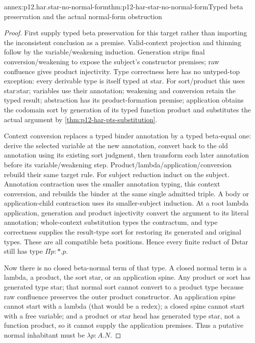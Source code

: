 \begin{annexitem}{annex:p12.har.star-no-normal-form}{thm:p12-har-star-no-normal-form}{Typed beta preservation and the actual normal-form obstruction}
\begin{proof}
First supply typed beta preservation for this target rather than importing
the inconsistent conclusion as a premise. Valid-context projection and
thinning follow by the variable/weakening induction. Generation strips
final conversion/weakening to expose the subject's constructor premises;
raw confluence gives product injectivity. Type correctness here has no
untyped-top exception: every derivable type is itself typed at star.
For sort/product this uses star:star; variables use their annotation;
weakening and conversion retain the typed result; abstraction has its
product-formation premise; application obtains the codomain sort by
generation of its typed function product and substitutes the actual
argument by \cref{thm:p12-har-pts-substitution}.

Context conversion replaces a typed binder annotation by a typed
beta-equal one: derive the selected variable at the new annotation,
convert back to the old annotation using its existing sort judgment,
then transform each later annotation before its variable/weakening step.
Product/lambda/application/conversion rebuild their same target rule.
For subject reduction induct on the subject. Annotation contraction
uses the smaller annotation typing, this context conversion, and
rebuilds the binder at the same single admitted triple. A body or
application-child contraction uses its smaller-subject induction.
At a root lambda application, generation and product injectivity
convert the argument to its literal annotation; whole-context
substitution types the contractum, and type correctness supplies the
result-type sort for restoring its generated and original types.
These are all compatible beta positions. Hence every finite reduct
of Dstar still has type \(\Pi p:\ast.p\).

Now there is no closed beta-normal term of that type. A closed normal
term is a lambda, a product, the sort star, or an application spine.
Any product or sort has generated type star; that normal sort cannot
convert to a product type because raw confluence preserves the outer
product constructor. An application spine cannot start with a lambda
(that would be a redex); a closed spine cannot start with a free
variable; and a product or star head has generated type star, not a
function product, so it cannot supply the application premises. Thus
a putative normal inhabitant must be \(\lambda p:A.N\).


\end{proof}
\end{annexitem}
